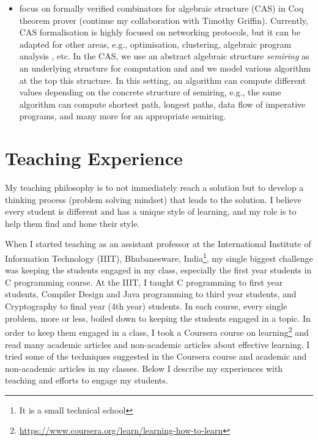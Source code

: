 \documentclass[a4paper]{article}
\begin{document}
\begin{itemize}
\item focus on formally verified combinators for algebraic structure (CAS) in Coq theorem prover 
	(continue my collaboration with Timothy Griffin). 
	Currently, CAS formalisation is highly focused on networking protocols, but it can be 
	adapted for other areas, e.g., optimisation, clustering, algebraic program 
	analysis , etc. In the CAS, we use an abstract algebraic structure 
	\emph{semiring} as an underlying structure
	for computation and and we model various algorithm at the top this 
	structure. In this setting, an algorithm can compute different values depending 
	on the concrete structure of semiring, e.g., the same algorithm 
	can compute shortest path, longest paths, 
	data flow of imperative programs, and many more \cite{gondran2008graphs} 
	for an appropriate semiring.
	

\end{itemize}



\section{Teaching Experience}
My teaching philosophy is to not immediately reach a solution but to develop a 
thinking process (problem solving mindset) that leads to the solution. I believe every 
student is different and has a unique style of learning, and my role is to help them find 
and hone their style.


When I started teaching as an assistant professor at the International Institute of Information 
Technology (IIIT), Bhubanesware, India\footnote{It is a small technical school},
my single biggest challenge was keeping the students engaged in my class, especially the first year 
students in C programming course. At the IIIT, I taught C programming to 
first year students, Compiler Design and Java programming to third year students, and
Cryptography to final year (4th year) students. In each course, every single 
problem,  more or less, boiled down to keeping the students engaged in a topic. 
In order to keep them engaged in a class, I took a Coursera course on 
learning\footnote{\url{https://www.coursera.org/learn/learning-how-to-learn}} and 
read many academic articles and non-academic articles about effective learning.
I tried some of the techniques suggested in the Coursera course and 
academic and non-academic articles in my classes. Below I 
describe my experiences with teaching and efforts to engage my students. 
\end{document}
